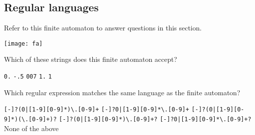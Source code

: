 \documentclass[addpoints,answers]{exam}
\begin{document}
\begin{questions}

\pagebreak
\section{Regular languages}
Refer to this finite automaton to answer questions in this section. 

\texttt{[image: fa]}

\question Which of these strings does this finite automaton accept?

\begin{oneparchoices}
\choice \verb$0.$
\choice \verb$-.5$
\choice \verb$007$
\choice \verb$1.$
\choice \verb$1$
\end{oneparchoices}

\answerline[E]

\question Which regular expression matches the same language as the finite automaton?

\begin{choices}
\choice \verb$[-]?(0|[1-9][0-9]*)\.[0-9]+$
\choice \verb$[-]?0|[1-9][0-9]*\.[0-9]+$
\choice \verb$[-]?(0|[1-9][0-9]*)(\.[0-9]+)?$
\choice \verb$[-]?(0|[1-9][0-9]*)\.[0-9]+?$
\choice \verb$[-]?0|[1-9][0-9]*\.[0-9]+?$
\choice None of the above
\end{choices}


\end{questions}
\end{document}
